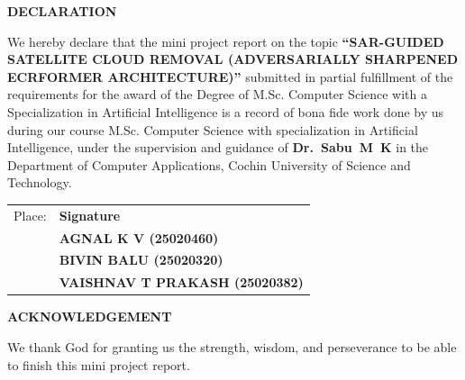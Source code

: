 \documentclass[12pt,a4paper]{report}
\begin{document}
\newpage

\thispagestyle{empty}
\begin{center}
    \vspace*{1.2cm}
    {\Large \textbf{DECLARATION}}\\[1.2cm]
\end{center}

\noindent We hereby declare that the mini project report on the topic \textbf{``SAR-GUIDED SATELLITE CLOUD REMOVAL (ADVERSARIALLY SHARPENED ECRFORMER ARCHITECTURE)''} submitted in partial fulfillment of the requirements for the award of the Degree of M.Sc. Computer Science with a Specialization in Artificial Intelligence is a record of bona fide work done by us during our course M.Sc. Computer Science with specialization in Artificial Intelligence, under the supervision and guidance of \mbox{\textbf{Dr.~Sabu~M~K}} in the Department of Computer Applications, Cochin University of Science and Technology.

\vfill

\noindent
\begin{tabular}{@{}p{}p{}@{}}
    Place: & \textbf{Signature} \\[0.35cm]
    & \textbf{AGNAL K V (25020460)} \\[0.25cm]
    & \textbf{BIVIN BALU (25020320)} \\[0.25cm]
    & \textbf{VAISHNAV T PRAKASH (25020382)} \\
\end{tabular}
\vspace*{1.0cm}

\newpage

\thispagestyle{empty}
\begin{center}
    \vspace*{1.0cm}
    {\Large \textbf{ACKNOWLEDGEMENT}}\\[1.1cm]
\end{center}

\noindent We thank God for granting us the strength, wisdom, and perseverance to be able to finish this mini project report.
\end{document}
